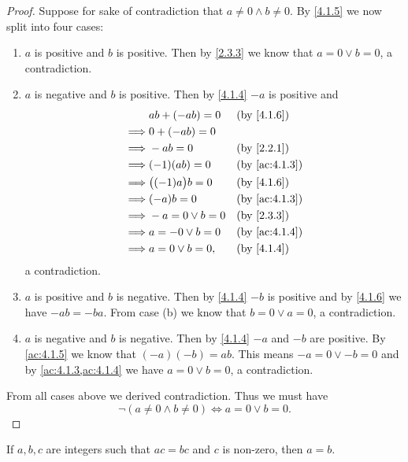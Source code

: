 \begin{proof}
  Suppose for sake of contradiction that \(a \neq 0 \land b \neq 0\).
  By \cref{4.1.5} we now split into four cases:
  \begin{enumerate}
    \item \(a\) is positive and \(b\) is positive.
          Then by \cref{2.3.3} we know that \(a = 0 \lor b = 0\), a contradiction.
    \item \(a\) is negative and \(b\) is positive.
          Then by \cref{4.1.4} \(-a\) is positive and
          \begin{align*}
                     & ab + (-ab) = 0       &  & \by{4.1.6}    \\
            \implies & 0 + (-ab) = 0                           \\
            \implies & -ab = 0              &  & \by{2.2.1}    \\
            \implies & (-1)(ab) = 0         &  & \by{ac:4.1.3} \\
            \implies & \big((-1)a\big)b = 0 &  & \by{4.1.6}    \\
            \implies & (-a)b = 0            &  & \by{ac:4.1.3} \\
            \implies & -a = 0 \lor b = 0    &  & \by{2.3.3}    \\
            \implies & a = -0 \lor b = 0    &  & \by{ac:4.1.4} \\
            \implies & a = 0 \lor b = 0,    &  & \by{4.1.4}
          \end{align*}
          a contradiction.
    \item \(a\) is positive and \(b\) is negative.
          Then by \cref{4.1.4} \(-b\) is positive and by \cref{4.1.6} we have \(-ab = -ba\).
          From case (b) we know that \(b = 0 \lor a = 0\), a contradiction.
    \item \(a\) is negative and \(b\) is negative.
          Then by \cref{4.1.4} \(-a\) and \(-b\) are positive.
          By \cref{ac:4.1.5} we know that \((-a)(-b) = ab\).
          This means \(-a = 0 \lor -b = 0\) and by \cref{ac:4.1.3,ac:4.1.4} we have \(a = 0 \lor b = 0\), a contradiction.
  \end{enumerate}
  From all cases above we derived contradiction.
  Thus we must have
  \[
    \lnot(a \neq 0 \land b \neq 0) \iff a = 0 \lor b = 0.
  \]
\end{proof}

\begin{cor}\label{4.1.9}
  If \(a, b, c\) are integers such that \(ac = bc\) and \(c\) is non-zero, then \(a = b\).
\end{cor}

